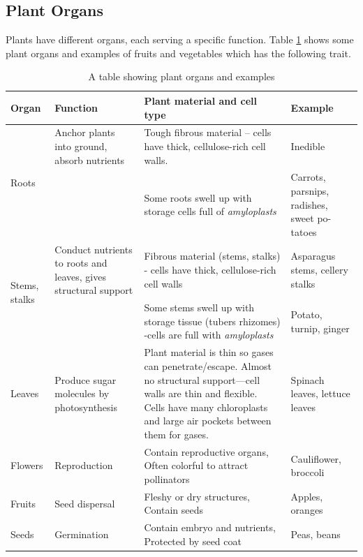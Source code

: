 \subsection*{Plant Organs}
Plants have different organs, each serving a specific function. Table \ref{tab:L01_plant_organs} shows some plant organs and examples of fruits and vegetables which has the following trait.
\begin{table}[ht]
    \centering
    \caption{A table showing plant organs and examples}
    \label{tab:L01_plant_organs}
    \begin{tabular}{|p{1.9cm}|p{3cm}|p{6cm}|p{3cm}|}
    \hline
    \textbf{Organ} & \textbf{Function} & \textbf{Plant material and cell type} & \textbf{Example} \\
    \hline
    \multirow{2}{3cm}{Roots} & Anchor plants into ground, absorb nutrients & Tough fibrous material -- cells have thick, cellulose-rich cell walls.  & Inedible \\
    \cline{3-4}
    & & Some roots swell up with storage cells full of \textit{amyloplasts} & Carrots, parsnips, radishes, sweet po-tatoes \\
    \hline
    \multirow{2}{3cm}{Stems, stalks} & Conduct nutrients to roots and leaves, gives structural support & Fibrous material (stems, stalks) - cells have thick, cellulose-rich cell walls & Asparagus stems, cellery stalks \\
    \cline{1-1} \cline{3-4}
    Tubers, rhizomes & & Some stems swell up with storage tissue (tubers rhizomes) -cells are full with \textit{amyloplasts} & Potato, turnip, ginger \\
    \hline
    Leaves & Produce sugar molecules by photosynthesis & Plant material is thin so gases can penetrate/escape. Almost no structural support—cell walls are thin and flexible. Cells have many chloroplasts and large air pockets between them for gases. & Spinach leaves, lettuce leaves \\
    \hline
    Flowers & Reproduction & Contain reproductive organs, Often colorful to attract pollinators & Cauliflower, broccoli \\
    \hline
    Fruits & Seed dispersal & Fleshy or dry structures, Contain seeds & Apples, oranges \\
    \hline
    Seeds & Germination & Contain embryo and nutrients, Protected by seed coat & Peas, beans \\
    \hline
    \end{tabular}
\end{table}

